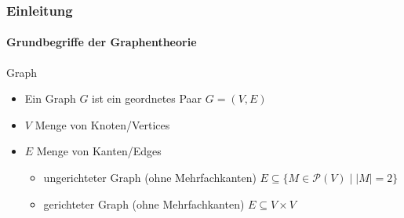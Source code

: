 \begin{frame}
    \frametitle{Einleitung}
    \framesubtitle{Grundbegriffe der Graphentheorie}
    \begin{KITexampleblock}{Graph}
\begin{itemize}
    \item Ein Graph $G$ ist ein geordnetes Paar $G = (V, E)$
    \item $V$ Menge von Knoten/Vertices
    \item $E$ Menge von Kanten/Edges
    \begin{itemize}
        \item ungerichteter Graph (ohne Mehrfachkanten) $E \subseteq \{ M \in \mathcal{P}(V) \mid |M| = 2\}$
        \item gerichteter Graph (ohne Mehrfachkanten) $E \subseteq V \times V$
    \end{itemize}
\end{itemize}
    \end{KITexampleblock}
\end{frame}

